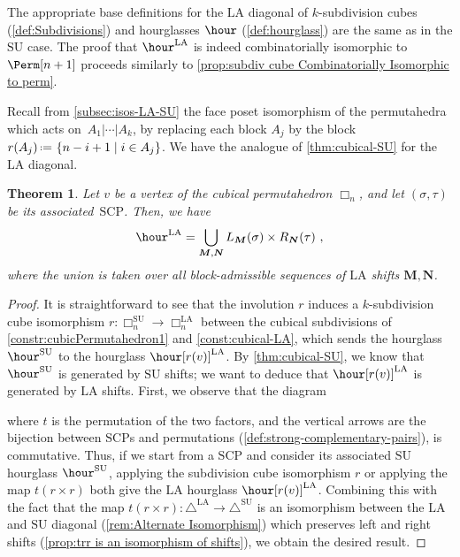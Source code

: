 \documentclass{amsart}
\newtheorem{theorem}{Theorem}[section]
\theoremstyle{definition}
\renewcommand{\b}[1]{{\boldsymbol{#1}}} %
\newcommand{\set}[2]{\left\{ #1 \;\middle|\; #2 \right\}} %
\newcommand{\eqdef}{\mbox{\,\raisebox{0.2ex}{\scriptsize\ensuremath{\mathrm:}}\ensuremath{=}\,}} %
\renewcommand{\b}[1]{\boldsymbol{#1}} %
\newcommand{\SU}{\mathrm{SU}}
\newcommand{\LA}{\mathrm{LA}}
\newcommand{\SUD}{\triangle^{\mathrm{SU}}}
\newcommand{\LAD}{\triangle^{\mathrm{LA}}}
\newcommand{\SCP}{\mathrm{SCP}}
\newcommand{\divcube}[1]{\Box_{#1}}
\begin{document}
The appropriate base definitions for the $\LA$ diagonal of $k$-subdivision cubes (\cref{def:Subdivisions}) and hourglasses ${\hour}$ (\cref{def:hourglass}) are the same as in the $\SU$ case.
The proof that $\hour^\LA $ is indeed combinatorially isomorphic to $\Perm[n+1]$ proceeds similarly to \cref{prop:subdiv cube Combinatorially Isomorphic to perm}.

Recall from \cref{subsec:isos-LA-SU} the face poset isomorphism of the permutahedra which acts on~$A_1| \cdots |A_k$, by replacing each block $A_j$ by the block $r(A_j)\eqdef\set{n-i+1}{i \in A_j}$.
We have the analogue of \cref{thm:cubical-SU} for the $\LA$ diagonal. 

\begin{theorem}
	\label{prop:LA-cubical}
	Let $v$ be a vertex of the cubical permutahedron $\divcube{n}$, and let $(\sigma,\tau)$ be its associated~$\SCP$. 
	Then, we have 
	\[ \hour^\LA = \bigcup_{\b{M},\b{N}}L_{\b{M}}(\sigma) \times R_{\b{N}}(\tau) \ , \]
where the union is taken over all block-admissible sequences of $\LA$ shifts $\b{M},\b{N}$.
\end{theorem}

\begin{proof}
	It is straightforward to see that the involution $r$ induces a $k$-subdivision cube isomorphism $r:\divcube{n}^{\SU}\to \divcube{n}^{\LA}$ between the cubical subdivisions of \cref{constr:cubicPermutahedron1} and \cref{const:cubical-LA}, which sends the hourglass $\hour^\SU$ to the hourglass $\hour[r(v)]^\LA$.  
	By \cref{thm:cubical-SU}, we know that $\hour^\SU$ is generated by $\SU$ shifts; we want to deduce that $\hour[r(v)]^\LA$ is generated by $\LA$ shifts. 
	First, we observe that the diagram
	\begin{center}
	\end{center}
	where $t$ is the permutation of the two factors, and the vertical arrows are the bijection between $\SCP$s and permutations (\cref{def:strong-complementary-pairs}), is commutative.
	Thus, if we start from a $\SCP$ and consider its associated $\SU$ hourglass $\hour^\SU$, applying the subdivision cube isomorphism $r$ or applying the map $t(r \times r)$ both give the $\LA$ hourglass $\hour[r(v)]^\LA$.
	Combining this with the fact that the map $t(r\times r):\LAD\to \SUD$ is an isomorphism between the $\LA$ and $\SU$ diagonal (\cref{rem:Alternate Isomorphism}) which preserves left and right shifts (\cref{prop:trr is an isomorphism of shifts}), we obtain the desired result. 
\end{proof}
\end{document}
